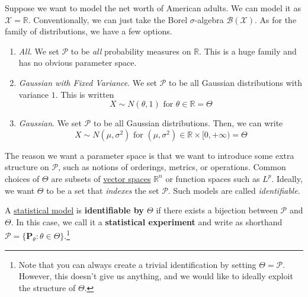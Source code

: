   \begin{example}
    \label{ex:modelling-net-worth}
    Suppose we want to model the net worth of American adults. We can model it as $\mathcal{X} = \mathbb{R}$. Conventionally, we can just take the Borel $\sigma$-algebra $\mathcal{B}(\mathcal{X})$. As for the family of distributions, we have a few options. 
    \begin{enumerate}
      \item \textit{All}. We set $\mathcal{P}$ to be \textit{all} probability measures on $\mathbb{R}$. This is a huge family and has no obvious parameter space. 
      \item \textit{Gaussian with Fixed Variance}. We set $\mathcal{P}$ to be all Gaussian distributions with variance $1$. This is written 
        \begin{equation}
          X \sim N(\theta, 1) \text{ for } \theta \in \mathbb{R} = \Theta
        \end{equation}
      \item \textit{Gaussian}. We set $\mathcal{P}$ to be all Gaussian distributions. Then, we can write 
        \begin{equation}
          X \sim N(\mu, \sigma^2) \text{ for } (\mu, \sigma^2) \in \mathbb{R} \times [0, +\infty) = \Theta
        \end{equation}
    \end{enumerate}
  \end{example}

  The reason we want a parameter space is that we want to introduce some extra structure on $\mathcal{P}$, such as notions of orderings, metrics, or operations. Common choices of $\Theta$ are subsets of \hyperref[lin-def:vector-space]{vector spaces} $\mathbb{R}^n$ or function spaces such as $L^p$. Ideally, we want $\Theta$ to be a set that \textit{indexes} the set $\mathcal{P}$. Such models are called \textit{identifiable}. 

  \begin{definition}[Identifiability]
    \label{def:identifiability}
    A \hyperref[def:statistical-model]{statistical model} is \textbf{identifiable by $\Theta$} if there exists a bijection between $\mathcal{P}$ and $\Theta$. In this case, we call it a \textbf{statistical experiment} and write as shorthand $\mathcal{P} = \{ \mathbf{P}_\theta \colon \theta \in \Theta\}$.\footnote{Note that you can always create a trivial identification by setting $\Theta = \mathcal{P}$. However, this doesn't give us anything, and we would like to ideally exploit the structure of $\Theta$.}
  \end{definition} 

